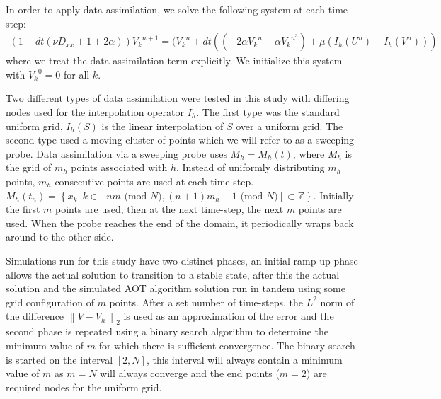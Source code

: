 \documentclass[12pt]{amsart}
\theoremstyle{plain}
\theoremstyle{definition}
\theoremstyle{remark}
\numberwithin{equation}{section} %
\numberwithin{figure}{section}   %
\newcommand{\field}[1]{\mathbb{#1}}
\newcommand{\nZ}{\field{Z}}
\newcommand{\norm}[1]{\left\|#1\right\|}
\begin{document}
 In order to apply data assimilation, we solve the following system at each time-step:
 \begin{align*}
 (1 - dt(\nu D_{xx} + 1+2\alpha)){V_k}^{n+1} =  ({V_k}^n+dt((-2\alpha{V_k}^n - \alpha {V_k}^{n^3}) +\mu(I_h(U^n) - I_h(V^n)))
 \end{align*}
 where we treat the data assimilation term explicitly. We initialize this system with ${V_k}^0 = 0$ for all $k$.
 
 Two different types of data assimilation were tested in this study with differing nodes used for the interpolation operator $I_h$. The first type was the standard uniform grid, $I_h(S)$ is the linear interpolation of $S$ over a uniform grid. The second type used a moving cluster of points which we will refer to as a sweeping probe. Data assimilation via a sweeping probe uses $M_h = M_h(t)$, where $M_h$ is the grid of $m_h$ points associated with $h$. Instead of uniformly distributing $m_h$ points, $m_h$ consecutive points are used at each time-step. \\
 $M_h{(t_n)} = \left\{x_k |~ k\in [nm \text{ (mod } N),(n+1)m_h - 1 \text{ (mod } N)] \subset\nZ \right\}$. Initially the first $m$ points are used, then at the next time-step, the next $m$ points are used. When the probe reaches the end of the domain, it periodically wraps back around to the other side.  
 
 Simulations run for this study have two distinct phases, an initial ramp up phase allows the actual solution to transition to a stable state, after this the actual solution and the simulated AOT algorithm solution run in tandem using some grid configuration of $m$ points. After a set number of time-steps, the $L^2$ norm of the difference $\norm{V-V_h}_{2}$ is used as an approximation of the error  and the second phase is repeated using a binary search algorithm to determine the minimum value of $m$ for which there is sufficient convergence. The binary search is started on the interval $\left[2,N\right]$, this interval will always contain a minimum value of $m$ as $m=N$ will always converge and the end points ($m=2$) are required nodes for the uniform grid. 
\end{document}
